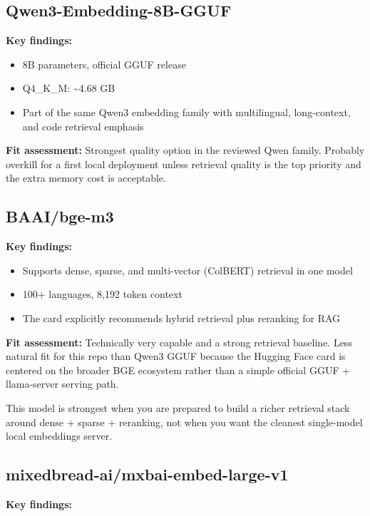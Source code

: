 \subsection{Qwen3-Embedding-8B-GGUF}

\textbf{Key findings:}

\begin{itemize}
    \item 8B parameters, official GGUF release
    \item Q4\_K\_M: \textasciitilde4.68 GB
    \item Part of the same Qwen3 embedding family with multilingual, long-context, and
          code retrieval emphasis
\end{itemize}

\textbf{Fit assessment:} Strongest quality option in the reviewed Qwen family. Probably
overkill for a first local deployment unless retrieval quality is the top priority and the
extra memory cost is acceptable.

\subsection{BAAI/bge-m3}

\textbf{Key findings:}

\begin{itemize}
    \item Supports dense, sparse, and multi-vector (ColBERT) retrieval in one model
    \item 100+ languages, 8{,}192 token context
    \item The card explicitly recommends hybrid retrieval plus reranking for RAG
\end{itemize}

\textbf{Fit assessment:} Technically very capable and a strong retrieval baseline. Less
natural fit for this repo than Qwen3 GGUF because the Hugging Face card is centered on the
broader BGE ecosystem rather than a simple official GGUF + llama-server serving path.

This model is strongest when you are prepared to build a richer retrieval stack around dense
+ sparse + reranking, not when you want the cleanest single-model local embeddings server.

\subsection{mixedbread-ai/mxbai-embed-large-v1}

\textbf{Key findings:}

